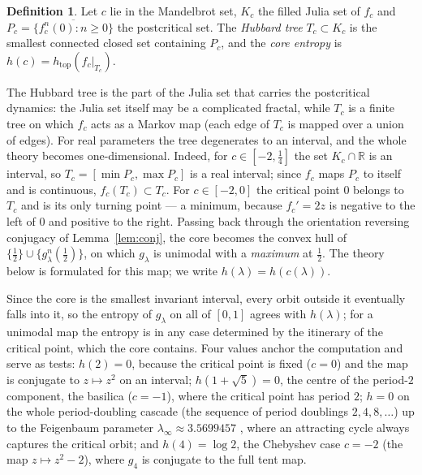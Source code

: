 \documentclass[11pt]{article}
\theoremstyle{plain}
\theoremstyle{definition}
\newtheorem{definition}[theorem]{Definition}
\newcommand{\R}{\mathbb{R}}
\newcommand{\htop}{h_{\mathrm{top}}}
\begin{document}
\begin{definition}\label{def:core}
Let $c$ lie in the Mandelbrot set, $K_c$ the filled Julia set of $f_c$ and
$P_c=\overline{\{f_c^n(0):n\ge0\}}$ the postcritical set.  The \emph{Hubbard tree}
$T_c\subset K_c$ is the smallest connected closed set containing $P_c$, and the
\emph{core entropy} is $h(c)=\htop(f_c|_{T_c})$.
\end{definition}

The Hubbard tree is the part of the Julia set that carries the postcritical dynamics: the
Julia set itself may be a complicated fractal, while $T_c$ is a finite tree on which $f_c$
acts as a Markov map (each edge of $T_c$ is mapped over a union of edges).  For real
parameters the tree degenerates to an interval, and
the whole theory becomes one-dimensional.  Indeed, for $c\in[-2,\tfrac14]$ the set $K_c\cap\R$
is an interval, so $T_c=[\min P_c,\max P_c]$ is a real interval; since $f_c$ maps $P_c$ to
itself and is continuous, $f_c(T_c)\subset T_c$.  For $c\in[-2,0]$ the critical point $0$
belongs to $T_c$ and is its only turning point --- a minimum, because $f_c'=2z$ is negative
to the left of $0$ and positive to the right.  Passing back through the orientation
reversing conjugacy of Lemma~\ref{lem:conj}, the core becomes the convex hull of
$\{\tfrac12\}\cup\{g_\lambda^n(\tfrac12)\}$, on which $g_\lambda$ is unimodal with a
\emph{maximum} at $\tfrac12$.  The theory below is formulated for this map; we write
$h(\lambda)=h(c(\lambda))$.

Since the core is the smallest invariant interval, every orbit outside it eventually falls
into it, so the entropy of $g_\lambda$ on all of $[0,1]$ agrees with $h(\lambda)$; for a
unimodal map the entropy is in any case determined by the itinerary of the critical point,
which the core contains.  Four values anchor the computation and serve as tests: $h(2)=0$,
because the critical point is fixed ($c=0$) and the map is conjugate to $z\mapsto z^2$ on
an interval; $h(1+\sqrt5)=0$, the centre of the period-$2$ component, the basilica ($c=-1$),
where the
critical point has period $2$; $h=0$ on the whole period-doubling cascade (the sequence of
period doublings $2,4,8,\dots$) up to the Feigenbaum parameter $\lambda_\infty\approx3.5699457$ \cite{Feig},
where an attracting cycle always
captures the critical orbit; and $h(4)=\log2$, the Chebyshev case $c=-2$ (the map
$z\mapsto z^2-2$), where $g_4$ is
conjugate to the full tent map.
\end{document}
